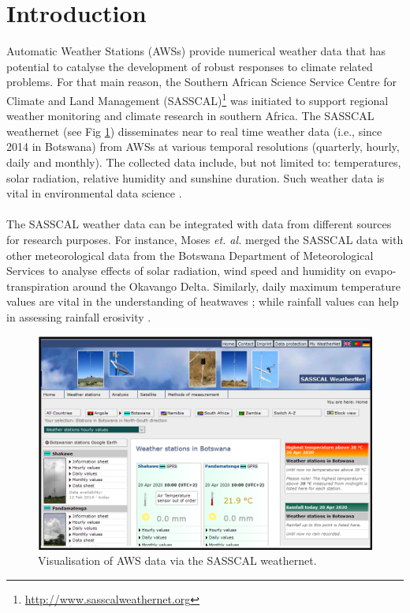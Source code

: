 \documentclass[a4paper, 10pt, conference]{ieeeconf}      %
\begin{document}
\section{Introduction}
\label{Intro}
\noindent
Automatic Weather Stations (AWSs) provide numerical weather data that has potential to catalyse the development of robust responses to   climate related problems. For that main reason, the Southern African Science Service Centre for Climate and Land Management (SASSCAL)\footnote{\url{http://www.sasscalweathernet.org}\label{weathernet}}  was initiated to support regional weather monitoring and climate research in southern Africa. The SASSCAL weathernet (see Fig \ref{SASSCA}) disseminates near to real time weather data (i.e., since 2014 in Botswana) from AWSs at various temporal resolutions (quarterly, hourly, daily and monthly).   The collected data include, but not limited to: temperatures, solar radiation, relative humidity and sunshine duration. Such weather data is vital in environmental data science \cite{GIBERT20183}. %
\\
   	\\
   	   The SASSCAL weather data can be integrated with data from different sources for research purposes. For instance, Moses \textit{et. al.} \cite{moses2018effects}   merged the SASSCAL data with other  meteorological data from the Botswana Department of Meteorological Services  to analyse  effects of  solar radiation, wind speed and  humidity 	on evapo-transpiration around the Okavango Delta.  Similarly, daily maximum temperature values are vital in the understanding of heatwaves \cite{moses2017heat}; while rainfall values %
   	   can help in  assessing rainfall erosivity \cite{singh2020assessing}. %
   	   \newpage
\begin{figure}[tbh!]
\centering
\includegraphics[width=1\columnwidth]{fig/Sasscalweathernet.png}
\caption{Visualisation of  AWS data via the SASSCAL weathernet.}
\label{SASSCA}
\end{figure}
\end{document}
